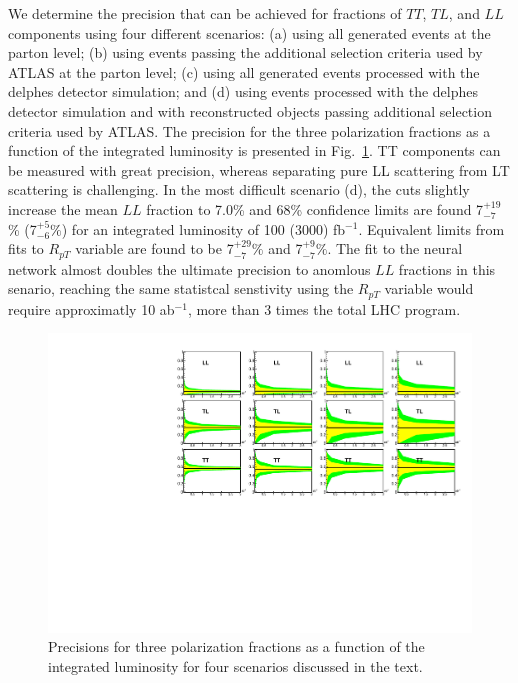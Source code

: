 We determine the precision that can be achieved for fractions of $TT$, $TL$, and $LL$ components using four different scenarios: (a) using all  generated events at the parton level; 
(b) using events passing the additional selection criteria used by ATLAS at the parton level; 
(c) using all generated events processed with the {\sc delphes} detector simulation; and (d) using events processed with the {\sc delphes} detector simulation and with reconstructed objects passing additional selection criteria used by ATLAS. 
The precision for the three polarization fractions as a function of the integrated luminosity is presented in Fig.~\ref{fig:sensitivity}. 
 TT components can be measured with great precision, whereas separating pure LL scattering from LT scattering is challenging.
In the most difficult scenario (d), the cuts slightly increase the mean $LL$ fraction to 7.0\% and 68\% confidence limits are found 7$^{+19}_{-7}$\% (7$^{+5}_{-6}\%$) for an integrated luminosity of 100 (3000) fb$^{-1}$.  Equivalent limits from fits to $R_{pT}$ variable are found to be 7$^{+29}_{-7}\%$ and 7$^{+9}_{-7}\%$. The fit to the neural network almost doubles the ultimate precision to anomlous $LL$ fractions in this senario, reaching the same statistcal senstivity using the $R_{pT}$ variable would require approximatly 10 ab$^{-1}$, more than 3 times the total LHC program.

\begin{figure}
\includegraphics[width=.9\textwidth]{./fig/12_LL_LT_TT.pdf}
\caption{ \label{fig:sensitivity} Precisions for three polarization fractions as a function of the integrated luminosity for four scenarios discussed in the text.}
\end{figure}



